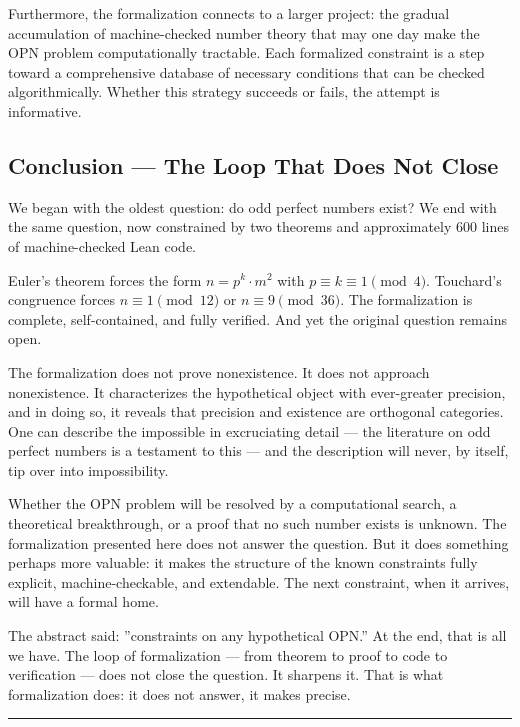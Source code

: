\documentclass[11pt,a4paper]{article}
\begin{document}
Furthermore, the formalization connects to a larger project: the gradual accumulation of machine-checked number theory that may one day make the OPN problem computationally tractable. Each formalized constraint is a step toward a comprehensive database of necessary conditions that can be checked algorithmically. Whether this strategy succeeds or fails, the attempt is informative.

\subsection{Conclusion --- The Loop That Does Not Close}

We began with the oldest question: do odd perfect numbers exist? We end with the same question, now constrained by two theorems and approximately 600 lines of machine-checked Lean code.

Euler's theorem forces the form $n = p^k \cdot m^2$ with $p \equiv k \equiv 1 \pmod{4}$. Touchard's congruence forces $n \equiv 1 \pmod{12}$ or $n \equiv 9 \pmod{36}$. The formalization is complete, self-contained, and fully verified. And yet the original question remains open.

The formalization does not prove nonexistence. It does not approach nonexistence. It characterizes the hypothetical object with ever-greater precision, and in doing so, it reveals that precision and existence are orthogonal categories. One can describe the impossible in excruciating detail --- the literature on odd perfect numbers is a testament to this --- and the description will never, by itself, tip over into impossibility.

Whether the OPN problem will be resolved by a computational search, a theoretical breakthrough, or a proof that no such number exists is unknown. The formalization presented here does not answer the question. But it does something perhaps more valuable: it makes the structure of the known constraints fully explicit, machine-checkable, and extendable. The next constraint, when it arrives, will have a formal home.

The abstract said: ''constraints on any hypothetical OPN.'' At the end, that is all we have. The loop of formalization --- from theorem to proof to code to verification --- does not close the question. It sharpens it. That is what formalization does: it does not answer, it makes precise.

\begin{center}
\rule{0.5\textwidth}{0.4pt}
\end{center}
\end{document}
